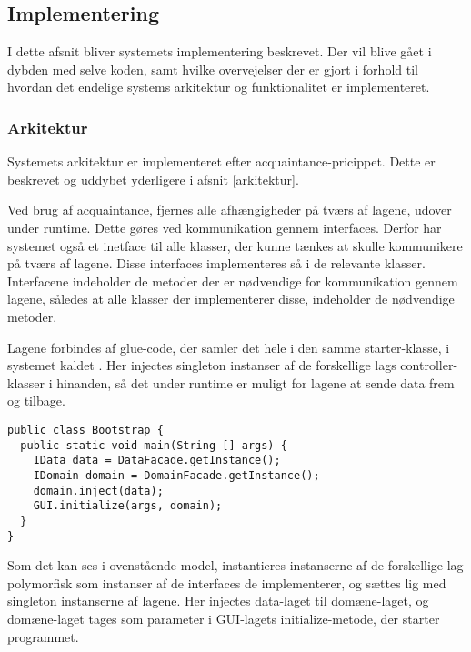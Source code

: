 \documentclass[../../main.tex]{subfiles}
\begin{document}
\subsection{Implementering}
I dette afsnit bliver systemets implementering beskrevet. Der vil blive gået i dybden med selve koden, samt hvilke overvejelser der er gjort i forhold til hvordan det endelige systems arkitektur og funktionalitet er implementeret.

\subsubsection{Arkitektur}
Systemets arkitektur er implementeret efter acquaintance-pricippet. Dette er beskrevet og uddybet yderligere i afsnit \ref{arkitektur}. 

Ved brug af acquaintance, fjernes alle afhængigheder på tværs af lagene, udover under runtime. Dette gøres ved kommunikation gennem interfaces. Derfor har systemet også et inetface til alle klasser, der kunne tænkes at skulle kommunikere på tværs af lagene. Disse interfaces implementeres så i de relevante klasser. Interfacene indeholder de metoder der er nødvendige for kommunikation gennem lagene, således at alle klasser der implementerer disse, indeholder de nødvendige metoder. 

Lagene forbindes af glue-code, der samler det hele i den samme starter-klasse, i systemet kaldet . Her injectes singleton instanser af de forskellige lags controller-klasser i hinanden, så det under runtime er muligt for lagene at sende data frem og tilbage. 

\begin{lstlisting}[caption=Bootstrap,captionpos=b, label=bootstrap_1]
public class Bootstrap {
  public static void main(String [] args) {
    IData data = DataFacade.getInstance();
    IDomain domain = DomainFacade.getInstance();
    domain.inject(data);
    GUI.initialize(args, domain);
  }
}

\end{lstlisting}

Som det kan ses i ovenstående model, instantieres instanserne af de forskellige lag polymorfisk som instanser af de interfaces de implementerer, og sættes lig med singleton instanserne af lagene. Her injectes data-laget til domæne-laget, og domæne-laget tages som parameter i GUI-lagets initialize-metode, der starter programmet.
\end{document}
